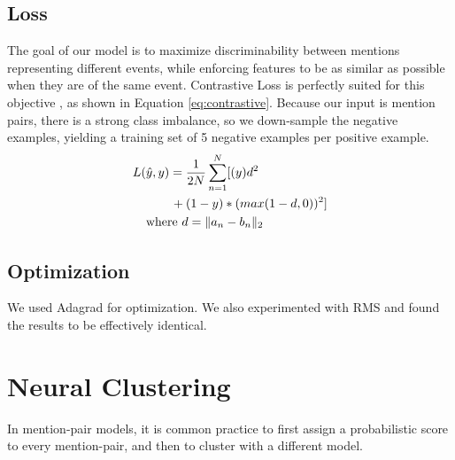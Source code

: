 \documentclass[11pt,a4paper]{article}
\begin{document}
\subsection{Loss}
The goal of our model is to maximize discriminability between mentions representing different events, while enforcing features to be as similar as possible when they are of the same event.  Contrastive Loss is perfectly suited for this objective \cite{SchroffKP15,pmlr-v48-liud16}, as shown in Equation \ref{eq:contrastive}.  Because our input is mention pairs, there is a strong class imbalance, so we down-sample the negative examples, yielding a training set of 5 negative examples per positive example.
\begin{equation}
\begin{aligned}
L(&\hat{y},y)=\frac{1}{2N}\sum_{n=1}^{N}[(y)d^2 \\
&\qquad {} + (1-y)*(max(1-d,0))^2] \\
&\textnormal{where }d=\|a_{n}-b_{n}\|_{2}
\end{aligned}
\label{eq:contrastive}
\end{equation}

\subsection{Optimization}
We used Adagrad for optimization.  We also experimented with RMS and found the results to be effectively identical.


\section{Neural Clustering}
\label{sec:clustering}
In mention-pair models, it is common practice to first assign a probabilistic score to every mention-pair, and then to cluster with a different model.
\end{document}
